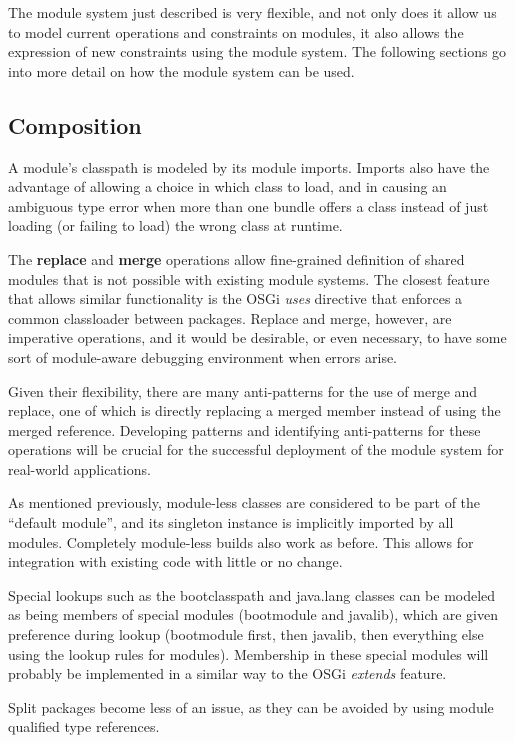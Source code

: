 The module system just described is very flexible, and not only does it
allow us to model current operations and constraints on modules, it also
allows the expression of new constraints using the module system. The following
sections go into more detail on how the module system can be used.

\subsection{Composition}

A module's classpath is modeled by its module imports. Imports also have the advantage
of allowing a choice in which class to load, and in causing an
ambiguous type error  when more than one bundle offers
a class instead of just loading (or failing to load) the wrong class at runtime.

The \textbf{replace} and \textbf{merge} operations allow fine-grained
definition of shared modules that is not possible with existing
module systems. The closest feature that allows similar functionality
is the OSGi \textit{uses} directive that enforces a common classloader
between packages. Replace and merge, however, are imperative operations, and it would
be desirable, or even necessary, to have some sort of module-aware 
debugging environment when errors arise. 

Given their flexibility,
there are many anti-patterns for the use of merge and replace, one of which
is directly replacing a merged member instead of using the merged reference.
Developing patterns and identifying anti-patterns for these operations will be
crucial for the successful deployment of the module system for real-world applications.

As mentioned previously, module-less classes are considered to be part 
of the ``default module'', and its singleton instance is implicitly 
imported by all modules. Completely module-less builds also work as before.
This allows for integration with existing code with little or no change.

Special lookups such as the bootclasspath and java.lang classes can be
modeled as being members of special modules (bootmodule and javalib), 
which are given preference during lookup (bootmodule first, then javalib,
then everything else using the lookup rules for modules). Membership
in these special modules will probably be implemented in a similar way to
the OSGi \textit{extends} feature.

Split packages become less of an issue, as they can be 
avoided by using module qualified type references.

